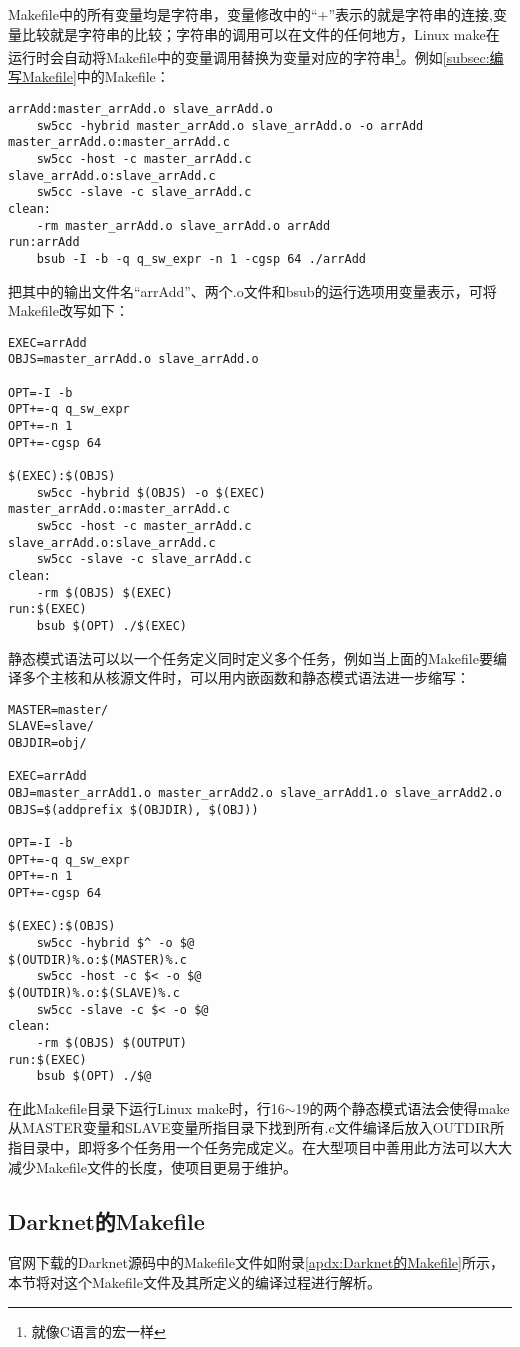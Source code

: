 Makefile中的所有变量均是字符串，变量修改中的“+”表示的就是字符串的连接,变量比较就是字符串的比较；字符串的调用可以在文件的任何地方，Linux make在运行时会自动将Makefile中的变量调用替换为变量对应的字符串\footnote{就像C语言的宏一样}。例如\ref{subsec:编写Makefile}中的Makefile：
\begin{lstlisting}
arrAdd:master_arrAdd.o slave_arrAdd.o
    sw5cc -hybrid master_arrAdd.o slave_arrAdd.o -o arrAdd
master_arrAdd.o:master_arrAdd.c
    sw5cc -host -c master_arrAdd.c
slave_arrAdd.o:slave_arrAdd.c
    sw5cc -slave -c slave_arrAdd.c
clean:
    -rm master_arrAdd.o slave_arrAdd.o arrAdd
run:arrAdd
    bsub -I -b -q q_sw_expr -n 1 -cgsp 64 ./arrAdd
\end{lstlisting}
把其中的输出文件名“arrAdd”、两个.o文件和bsub的运行选项用变量表示，可将Makefile改写如下：
\begin{lstlisting}
EXEC=arrAdd
OBJS=master_arrAdd.o slave_arrAdd.o

OPT=-I -b
OPT+=-q q_sw_expr
OPT+=-n 1
OPT+=-cgsp 64

$(EXEC):$(OBJS)
    sw5cc -hybrid $(OBJS) -o $(EXEC)
master_arrAdd.o:master_arrAdd.c
    sw5cc -host -c master_arrAdd.c
slave_arrAdd.o:slave_arrAdd.c
    sw5cc -slave -c slave_arrAdd.c
clean:
    -rm $(OBJS) $(EXEC)
run:$(EXEC)
    bsub $(OPT) ./$(EXEC)
\end{lstlisting}

静态模式语法可以以一个任务定义同时定义多个任务，例如当上面的Makefile要编译多个主核和从核源文件时，可以用内嵌函数和静态模式语法进一步缩写：
\begin{lstlisting}
MASTER=master/
SLAVE=slave/
OBJDIR=obj/

EXEC=arrAdd
OBJ=master_arrAdd1.o master_arrAdd2.o slave_arrAdd1.o slave_arrAdd2.o
OBJS=$(addprefix $(OBJDIR), $(OBJ))

OPT=-I -b
OPT+=-q q_sw_expr
OPT+=-n 1
OPT+=-cgsp 64

$(EXEC):$(OBJS)
    sw5cc -hybrid $^ -o $@
$(OUTDIR)%.o:$(MASTER)%.c
    sw5cc -host -c $< -o $@
$(OUTDIR)%.o:$(SLAVE)%.c
    sw5cc -slave -c $< -o $@
clean:
    -rm $(OBJS) $(OUTPUT)
run:$(EXEC)
    bsub $(OPT) ./$@
\end{lstlisting}
在此Makefile目录下运行Linux make时，行16$\sim$19的两个静态模式语法会使得make从MASTER变量和SLAVE变量所指目录下找到所有.c文件编译后放入OUTDIR所指目录中，即将多个任务用一个任务完成定义。在大型项目中善用此方法可以大大减少Makefile文件的长度，使项目更易于维护。

\subsection{Darknet的Makefile}
官网下载的Darknet源码中的Makefile文件如附录\ref{apdx:Darknet的Makefile}所示，本节将对这个Makefile文件及其所定义的编译过程进行解析。

